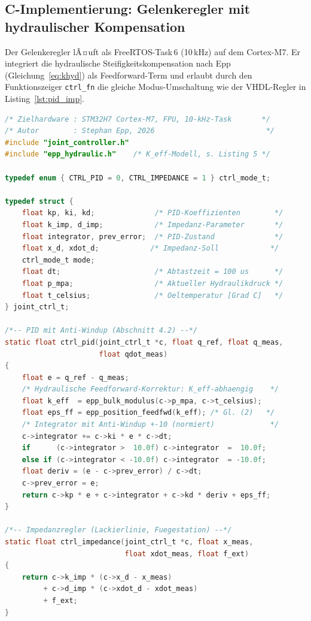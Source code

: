 ﻿\documentclass[a4paper,12pt]{scrreprt}
\theoremstyle{definition}
\begin{document}
\subsection{C-Implementierung: Gelenkeregler mit hydraulischer Kompensation}

Der Gelenkeregler lÃ¤uft als FreeRTOS-Task\,6 (10\,kHz) auf dem
Cortex-M7. Er integriert die hydraulische Steifigkeitskompensation
nach Epp (Gleichung~\ref{eq:khyd}) als Feedforward-Term und erlaubt
durch den Funktionszeiger \texttt{ctrl\_fn} die gleiche
Modus-Umschaltung wie der VHDL-Regler in Listing~\ref{lst:pid_imp}.

\begin{lstlisting}[language=C,
  caption={joint\_controller.c -- PID/Impedanz-Gelenkeregler
    mit hydraulischem Epp-Feedforward auf STM32H7 Cortex-M7 (10 kHz).},
  label={lst:joint_ctrl}]
/* Zielhardware : STM32H7 Cortex-M7, FPU, 10-kHz-Task       */
/* Autor        : Stephan Epp, 2026                          */
#include "joint_controller.h"
#include "epp_hydraulic.h"    /* K_eff-Modell, s. Listing 5 */

typedef enum { CTRL_PID = 0, CTRL_IMPEDANCE = 1 } ctrl_mode_t;

typedef struct {
    float kp, ki, kd;              /* PID-Koeffizienten        */
    float k_imp, d_imp;            /* Impedanz-Parameter       */
    float integrator, prev_error;  /* PID-Zustand              */
    float x_d, xdot_d;            /* Impedanz-Soll            */
    ctrl_mode_t mode;
    float dt;                      /* Abtastzeit = 100 us      */
    float p_mpa;                   /* Aktueller Hydraulikdruck */
    float t_celsius;               /* Oeltemperatur [Grad C]   */
} joint_ctrl_t;

/*-- PID mit Anti-Windup (Abschnitt 4.2) --*/
static float ctrl_pid(joint_ctrl_t *c, float q_ref, float q_meas,
                      float qdot_meas)
{
    float e = q_ref - q_meas;
    /* Hydraulische Feedforward-Korrektur: K_eff-abhaengig    */
    float k_eff  = epp_bulk_modulus(c->p_mpa, c->t_celsius);
    float eps_ff = epp_position_feedfwd(k_eff); /* Gl. (2)   */
    /* Integrator mit Anti-Windup +-10 (normiert)             */
    c->integrator += c->ki * e * c->dt;
    if      (c->integrator >  10.0f) c->integrator  =  10.0f;
    else if (c->integrator < -10.0f) c->integrator  = -10.0f;
    float deriv = (e - c->prev_error) / c->dt;
    c->prev_error = e;
    return c->kp * e + c->integrator + c->kd * deriv + eps_ff;
}

/*-- Impedanzregler (Lackierlinie, Fuegestation) --*/
static float ctrl_impedance(joint_ctrl_t *c, float x_meas,
                            float xdot_meas, float f_ext)
{
    return c->k_imp * (c->x_d - x_meas)
         + c->d_imp * (c->xdot_d - xdot_meas)
         + f_ext;
}


\end{lstlisting}
\end{document}
